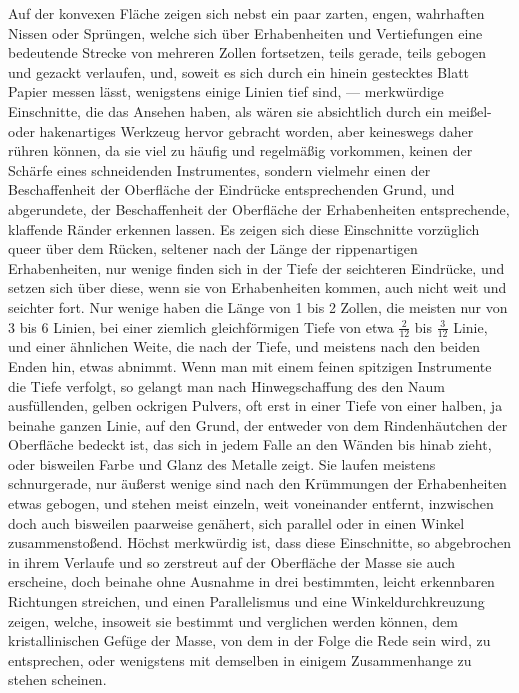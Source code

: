 \documentclass[a4paper, 11pt, oneside, german]{article}
\begin{document}
Auf der konvexen Fläche zeigen sich nebst ein paar zarten, engen, wahrhaften Nissen oder Sprüngen, welche sich über Erhabenheiten und Vertiefungen eine bedeutende Strecke von mehreren Zollen fortsetzen, teils gerade, teils gebogen und gezackt verlaufen, und, soweit es sich durch ein hinein gestecktes Blatt Papier messen lässt, wenigstens einige Linien tief sind, --- merkwürdige Einschnitte, die das Ansehen haben, als wären sie absichtlich durch ein meißel- oder hakenartiges Werkzeug hervor gebracht worden, aber keineswegs daher rühren können, da sie viel zu häufig und regelmäßig vorkommen, keinen der Schärfe eines schneidenden Instrumentes, sondern vielmehr einen der Beschaffenheit der Oberfläche der Eindrücke entsprechenden Grund, und abgerundete, der Beschaffenheit der Oberfläche der Erhabenheiten entsprechende, klaffende Ränder erkennen lassen. Es zeigen sich diese Einschnitte vorzüglich queer über dem Rücken, seltener nach der Länge der rippenartigen Erhabenheiten, nur wenige finden sich in der Tiefe der seichteren Eindrücke, und setzen sich über diese, wenn sie von Erhabenheiten kommen, auch nicht weit und seichter fort. Nur wenige haben die Länge von 1 bis 2 Zollen, die meisten nur von 3 bis 6 Linien, bei einer ziemlich gleichförmigen Tiefe von etwa $\frac{2}{12}$ bis $\frac{3}{12}$ Linie, und einer ähnlichen Weite, die nach der Tiefe, und meistens nach den beiden Enden hin, etwas abnimmt. Wenn man mit einem feinen spitzigen Instrumente die Tiefe verfolgt, so gelangt man nach Hinwegschaffung des den Naum ausfüllenden, gelben ockrigen Pulvers, oft erst in einer Tiefe von einer halben, ja beinahe ganzen Linie, auf den Grund, der entweder von dem Rindenhäutchen der Oberfläche bedeckt ist, das sich in jedem Falle an den Wänden bis hinab zieht, oder bisweilen Farbe und Glanz des Metalle zeigt. Sie laufen meistens schnurgerade, nur äußerst wenige sind nach den Krümmungen der Erhabenheiten etwas gebogen, und stehen meist einzeln, weit voneinander entfernt, inzwischen doch auch bisweilen paarweise genähert, sich parallel oder in einen Winkel zusammenstoßend. Höchst merkwürdig ist, dass diese Einschnitte, so abgebrochen in ihrem Verlaufe und so zerstreut auf der Oberfläche der Masse sie auch erscheine, doch beinahe ohne Ausnahme in drei bestimmten, leicht erkennbaren Richtungen streichen, und einen Parallelismus und eine Winkeldurchkreuzung zeigen, welche, insoweit sie bestimmt und verglichen werden können, dem kristallinischen Gefüge der Masse, von dem in der Folge die Rede sein wird, zu entsprechen, oder wenigstens mit demselben in einigem Zusammenhange zu stehen scheinen.
\end{document}
